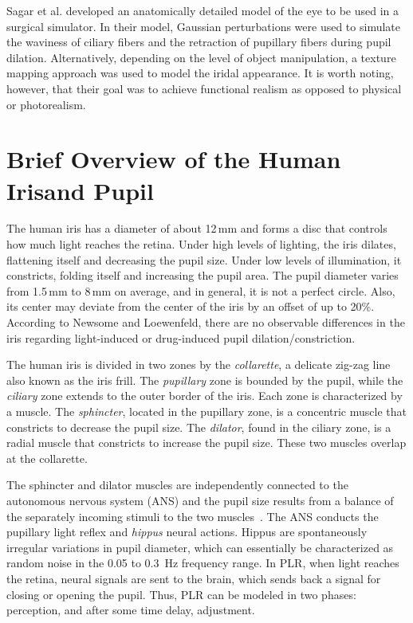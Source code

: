 \documentclass{acmtog} %
\begin{document}
Sagar et al. developed an anatomically detailed model of the eye to be
used in a surgical simulator. In their model, Gaussian perturbations
were used to simulate the waviness of ciliary fibers and the retraction
of pupillary fibers during pupil dilation. Alternatively, depending on
the level of object manipulation, a texture mapping approach was used to
model the iridal appearance. It is worth noting, however, that their
goal was to achieve functional realism \cite{DS-02} as opposed to
physical or photorealism.

\section{Brief Overview of the Human Iris\break and Pupil}
\label{sec:biologicalreview}

The human iris has a diameter of about 12\,mm and forms a disc that
controls how much light reaches the retina. Under high levels of
lighting, the iris dilates, flattening itself and decreasing the pupil
size. Under low levels of illumination, it constricts, folding itself
and increasing the pupil area. The pupil diameter varies from 1.5\,mm to
8\,mm on average, and in general, it is not a perfect circle. Also, its
center may deviate from the center of the iris by an offset of up to
20\%. According to Newsome and Loewenfeld, there are no observable
differences in the iris regarding light-induced or drug-induced pupil
dilation/constriction.

The human iris is divided in two zones by the \emph{collarette}, a
delicate zig-zag line also known as the iris frill. The \emph{pupillary}
zone is bounded by the pupil, while the \emph{ciliary} zone extends to
the outer border of the iris. Each zone is characterized by a muscle.
The \emph{sphincter}, located in the pupillary zone, is a concentric
muscle that constricts to decrease the pupil size. The \emph{dilator},
found in the ciliary zone, is a radial muscle that constricts to
increase the pupil size. These two muscles overlap at the collarette.

The sphincter and dilator muscles are independently connected to the
autonomous nervous system (ANS) and the pupil size results from a
balance of the separately incoming stimuli to the two
muscles~\cite{Dod-1900}. The ANS conducts the pupillary light reflex and
\emph{hippus} neural actions. Hippus are spontaneously irregular
variations in pupil diameter, which can essentially be characterized as
random noise in the 0.05 to 0.3~Hz frequency range. In PLR, when light
reaches the retina, neural signals are sent to the brain, which sends
back a signal for closing or opening the pupil. Thus, PLR can be modeled
in two phases: perception, and after some time delay, adjustment.
\end{document}
